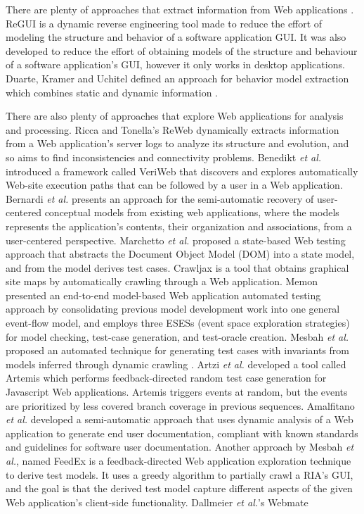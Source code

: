 \documentclass[conference]{IEEEtran}
\begin{document}
There are plenty of approaches that extract information from Web applications \cite{sampath2007applying,amalfitano2010rich, andjelkovic2011trace}. ReGUI \cite{coimbra2011reverse,coimbra2012dynamic} is a dynamic reverse engineering tool made to reduce the effort of modeling the structure and behavior of a software application GUI. It was also developed to reduce the effort of obtaining models of the structure and behaviour of a software
application's GUI, however it only works in desktop applications.
Duarte, Kramer and Uchitel defined an approach for behavior model extraction which combines static and dynamic information \cite{duarte2006model}.

There are also plenty of approaches that explore Web applications for analysis and processing. Ricca and Tonella's ReWeb \cite{ricca2001understanding} dynamically extracts information from a Web application's server logs to analyze its structure and evolution, and so aims to find inconsistencies and connectivity problems. Benedikt \textit{et al.} introduced a framework called VeriWeb \cite{benedikt2002veriWeb} that discovers and explores automatically Web-site execution paths that can be followed by a user in a Web application. Bernardi \textit{et al.} \cite{bernardi2008reverse} presents an approach for the semi-automatic recovery of user-centered conceptual models from existing web applications, where the models represents the application's contents, their organization and associations, from a user-centered perspective. Marchetto \textit{et al.} proposed a state-based Web testing approach \cite{marchetto2008state} that abstracts the Document Object Model (DOM) into a state model, and from the model derives test cases. Crawljax \cite{roest2010automated} is a tool that obtains graphical site maps by automatically crawling through a Web application. Memon presented an end-to-end model-based Web application automated testing approach \cite{memon2007event} by consolidating previous model development work into one general event-flow model, and employs three ESESs (event space exploration strategies) for model checking, test-case generation, and test-oracle creation. Mesbah \textit{et al.} proposed an automated technique for generating test cases with invariants from models inferred through dynamic crawling \cite{mesbah2012invariant}. Artzi \textit{et al.} developed a tool called Artemis \cite{artzi2011framework} which performs feedback-directed random test case generation for Javascript Web applications. Artemis triggers events at random, but the events are prioritized by less covered branch coverage in previous sequences. Amalfitano \textit{et al.} developed a semi-automatic approach \cite{amalfitano2011using} that uses dynamic analysis of a Web application to generate end user documentation, compliant with known standards and guidelines for software user documentation. Another approach by Mesbah \textit{et al.}, named FeedEx \cite{fard2013feedback} is a feedback-directed Web application exploration technique to derive test models. It uses a greedy algorithm to partially crawl a RIA's GUI, and the goal is that the derived test model capture different aspects of the given Web application's client-side functionality.  Dallmeier \textit{et al.}'s Webmate 
\end{document}
